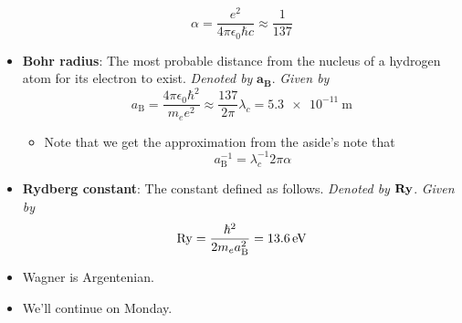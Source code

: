 \documentclass[../notes.tex]{subfiles}
\begin{document}
\begin{itemize}
    \begin{equation*}
        \alpha = \frac{e^2}{4\pi\epsilon_0\hbar c} \approx \frac{1}{137}
    \end{equation*}
    \item \textbf{Bohr radius}: The most probable distance from the nucleus of a hydrogen atom for its electron to exist. \emph{Denoted by} $\bm{a_\textbf{B}}$. \emph{Given by}
    \begin{equation*}
        a_\text{B} = \frac{4\pi\epsilon_0\hbar^2}{m_ee^2}
        \approx \frac{137}{2\pi}\lambda_c
        = \SI{5.3e-11}{\meter}
    \end{equation*}
    \begin{itemize}
        \item Note that we get the approximation from the aside's note that
        \begin{equation*}
            a_\text{B}^{-1} = \lambda_c^{-1}2\pi\alpha
        \end{equation*}
    \end{itemize}
    \item \textbf{Rydberg constant}: The constant defined as follows. \emph{Denoted by} $\bm{\Ry}$. \emph{Given by}
    \begin{equation*}
        \operatorname{Ry} = \frac{\hbar^2}{2m_ea_\text{B}^2} = \SI{13.6}{\electronvolt}
    \end{equation*}
    \item Wagner is Argentenian.
    \item We'll continue on Monday.
\end{itemize}
\end{document}
